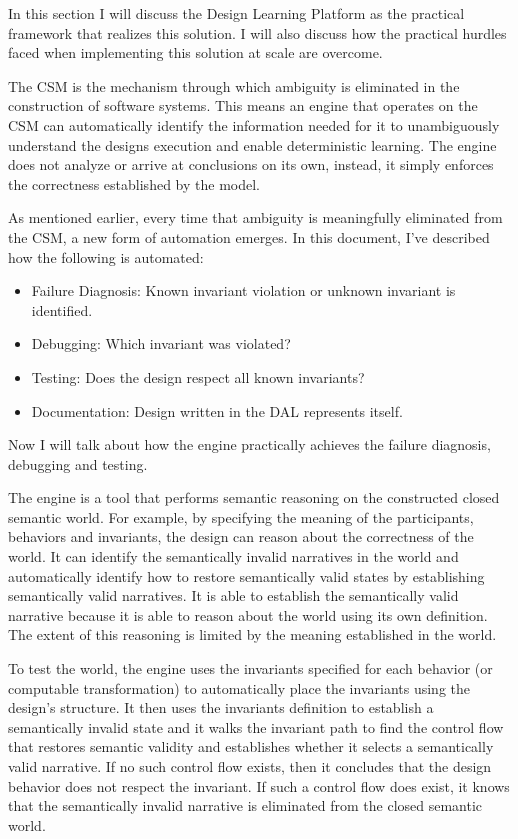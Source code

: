 In this section I will discuss the Design Learning Platform as the practical framework that realizes this solution. I will also discuss how the practical hurdles faced when implementing this solution at scale are overcome.

The CSM is the mechanism through which ambiguity is eliminated in the construction of software systems. This means an engine that operates on the CSM can automatically identify the information needed for it to unambiguously understand the designs execution and enable deterministic learning. The engine does not analyze or arrive at conclusions on its own, instead, it simply enforces the correctness established by the model.

As mentioned earlier, every time that ambiguity is meaningfully eliminated from the CSM, a new form of automation emerges. In this document, I've described how the following is automated:

\begin{itemize}
    \item Failure Diagnosis: Known invariant violation or unknown invariant is identified.
    \item Debugging: Which invariant was violated?
    \item Testing: Does the design respect all known invariants?
    \item Documentation: Design written in the DAL represents itself.
\end{itemize}

Now I will talk about how the engine practically achieves the failure diagnosis, debugging and testing.

The engine is a tool that performs semantic reasoning on the constructed closed semantic world. For example, by specifying the meaning of the participants, behaviors and invariants, the design can reason about the correctness of the world. It can identify the semantically invalid narratives in the world and automatically identify how to restore semantically valid states by establishing semantically valid narratives. It is able to establish the semantically valid narrative because it is able to reason about the world using its own definition. The extent of this reasoning is limited by the meaning established in the world.

To test the world, the engine uses the invariants specified for each behavior (or computable transformation) to automatically place the invariants using the design's structure. It then uses the invariants definition to establish a semantically invalid state and it walks the invariant path to find the control flow that restores semantic validity and establishes whether it selects a semantically valid narrative. If no such control flow exists, then it concludes that the design behavior does not respect the invariant. If such a control flow does exist, it knows that the semantically invalid narrative is eliminated from the closed semantic world.

